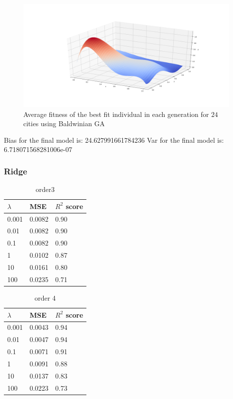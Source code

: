 \documentclass [11pt]{article}
\begin{document}
\begin{figure}[H]
\centering
\includegraphics[width=1\textwidth]{figures/olsFranke.png}
        \caption{Average fitness of the best fit individual in each generation for $24$ cities using Baldwinian GA}
        \label{fig:olsFranke}
\end{figure}
Bias for the final model is: 24.627991661784236
Var for the final model is: 6.718071568281006e-07
\subsubsection{Ridge}

\begin{table}[H]
\centering
\begin{tabular}{lll}
\hline
$\lambda$ & MSE    & $R^{2}$ score \\ \hline
0.001     & 0.0082 & 0.90          \\
0.01      & 0.0082 & 0.90          \\
0.1       & 0.0082 & 0.90          \\
1         & 0.0102 & 0.87          \\
10        & 0.0161 & 0.80          \\
100       & 0.0235 & 0.71          \\ \hline
\end{tabular}
\caption{order3}
\label{my-label}
\end{table}

\begin{table}[H]
\centering
\begin{tabular}{lll}
\hline
$\lambda$ & MSE    & $R^{2}$ score \\ \hline
0.001     & 0.0043 & 0.94          \\
0.01      & 0.0047 & 0.94          \\
0.1       & 0.0071 & 0.91          \\
1         & 0.0091 & 0.88          \\
10        & 0.0137 & 0.83          \\
100       & 0.0223 & 0.73          \\ \hline
\end{tabular}
\caption{order 4}
\label{my-label}
\end{table}
\end{document}

